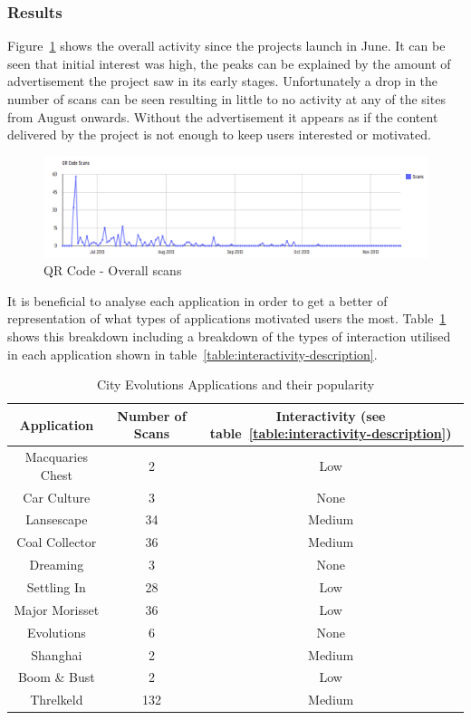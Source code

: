 \documentclass[a4paper,12pt]{article}
\begin{document}
\subsubsection{Results}
Figure~\ref{QR-overall-access-overTime} shows the overall activity since the projects launch in June. 
It can be seen that initial interest was high, the peaks can be explained by the amount of advertisement the project saw in its early stages. 
Unfortunately a drop in the number of scans can be seen resulting in little to no activity at any of the sites from August onwards.
Without the advertisement it appears as if the content delivered by the project is not enough to keep users interested or motivated.

\begin{figure}[ht!]
	\centering
	\includegraphics[width=150mm]{./images/OverallQRCodeDownload}
	\caption{QR Code - Overall scans}
	\label{QR-overall-access-overTime}
\end{figure}

\par
It is beneficial to analyse each application in order to get a better of representation of what types of applications motivated users the most. Table~\ref{table:application-popularity} shows this breakdown including a breakdown of the types of interaction utilised in each application shown in table~\ref{table:interactivity-description}.

\begin{table}[ht!]
	\centering
	\begin{tabular}{|c|c|c|}\hline
		\textbf{Application} & 	\textbf{Number of Scans} & \textbf{Interactivity (see table~\ref{table:interactivity-description})} \\\hline
		Macquaries Chest & 2 & Low\\
		Car Culture & 3 & None\\
		Lansescape & 34 & Medium\\
		Coal Collector & 36 & Medium\\
		Dreaming & 3 & None\\
		Settling In & 28 & Low\\
		Major Morisset & 36 & Low\\
		Evolutions & 6 & None\\
		Shanghai & 2 & Medium\\
		Boom \& Bust & 2 & Low\\
		Threlkeld 	&	132 & Medium\\\hline
	\end{tabular}
	\caption{City Evolutions Applications and their popularity}
	\label{table:application-popularity}
\end{table}
\end{document}
